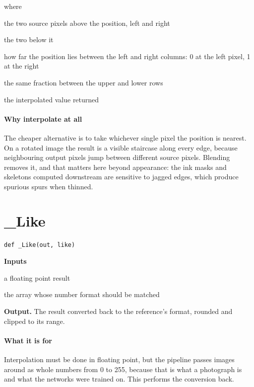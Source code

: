 \noindent where
\begin{description}[leftmargin=2.4em,style=nextline,font=\normalfont\ttfamily]\setlength\itemsep{1pt}
  \item[{$p_{00},\, p_{01}$}] \normalfont the two source pixels above the position, left and right
  \item[{$p_{10},\, p_{11}$}] \normalfont the two below it
  \item[{$f_x$}] \normalfont how far the position lies between the left and right columns: 0 at the left pixel, 1 at the right
  \item[{$f_y$}] \normalfont the same fraction between the upper and lower rows
  \item[{$v$}] \normalfont the interpolated value returned
\end{description}

\paragraph{Why interpolate at all}
The cheaper alternative is to take whichever single pixel the position is nearest. On a rotated image the result is a visible staircase along every edge, because neighbouring output pixels jump between different source pixels. Blending removes it, and that matters here beyond appearance: the ink masks and skeletons computed downstream are sensitive to jagged edges, which produce spurious spurs when thinned.


\section{\_Like}
\begin{lstlisting}[style=sig]
def _Like(out, like)
\end{lstlisting}

\noindent\textbf{Inputs}
\begin{description}[leftmargin=2.2em,style=nextline,font=\normalfont\ttfamily]\setlength\itemsep{1pt}
  \item[{out}] \normalfont a floating point result
  \item[{ref}] \normalfont the array whose number format should be matched
\end{description}

\noindent\textbf{Output.} The result converted back to the reference's format, rounded and clipped to its range.


\paragraph{What it is for}
Interpolation must be done in floating point, but the pipeline passes images around as whole numbers from 0 to 255, because that is what a photograph is and what the networks were trained on. This performs the conversion back.


